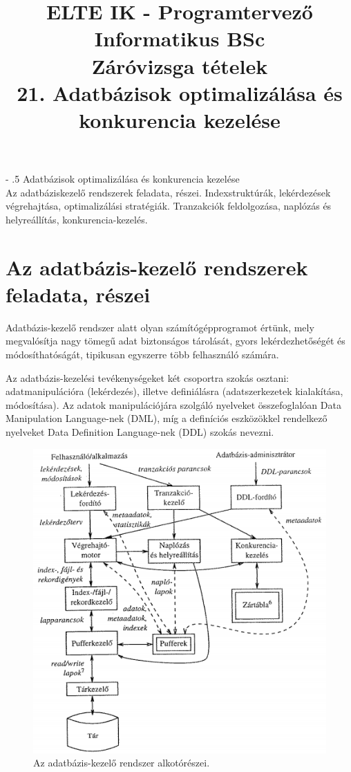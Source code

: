 \documentclass[margin=0px]{article}
\title{\textbf{{\Large ELTE IK - Programtervező Informatikus BSc} \vspace{0.2cm} \\ {\huge Záróvizsga tételek}} \vspace{0.3cm} \\ 21. Adatbázisok optimalizálása és konkurencia kezelése}
\author{}
\date{}
\makeatletter
\renewcommand\paragraph{%
	\@startsection{paragraph}{4}{0mm}%
	{-\baselineskip}%
	{.5\baselineskip}%
	{\normalfont\normalsize\bfseries}}
\newenvironment{tetel}[1]{\paragraph{#1 \\}}{}
\makeatother
\begin{document}
\maketitle

\begin{tetel}{Adatbázisok optimalizálása és konkurencia kezelése}
    Az adatbáziskezelő rendszerek feladata, részei. Indexstruktúrák, lekérdezések végrehajtása, optimalizálási stratégiák. Tranzakciók feldolgozása, naplózás és helyreállítás, konkurencia-kezelés.
\end{tetel}

\section{Az adatbázis-kezelő rendszerek feladata, részei}

Adatbázis-kezelő rendszer alatt olyan számítógépprogramot értünk, mely megvalósítja nagy tömegű adat biztonságos
tárolását, gyors lekérdezhetőségét és módosíthatóságát, tipikusan egyszerre	több felhasználó számára.

Az adatbázis-kezelési tevékenységeket két csoportra szokás osztani: adatmanipulációra (lekérdezés),
illetve definiálásra (adatszerkezetek kialakítása, módosítása). Az adatok manipulációjára szolgáló nyelveket összefoglalóan
Data Manipulation Language-nek (DML), míg a definíciós eszközökkel rendelkező nyelveket Data Definition Language-nek (DDL)
szokás nevezni.

\begin{figure}[H]
    \centering
    \includegraphics[width=0.7\linewidth]{img/db_felepites}
    \caption{Az adatbázis-kezelő rendszer alkotórészei.}
    \label{fig:db_felepites}
\end{figure}
\end{document}
